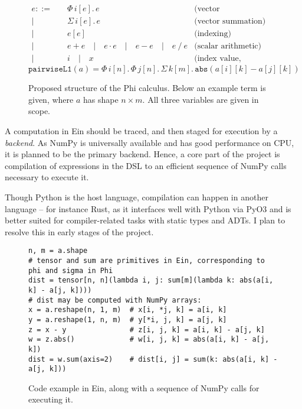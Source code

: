 \begin{figure}[h]
    \centering
    \begin{align*}
        e ::=& \quad \Phi\, i[e].\, e & \text{(vector comprehension)} \\
        |& \quad \Sigma\, i[e].\, e  & \text{(vector summation)} \\
        |& \quad e[e]  & \text{(indexing)} \\
        |& \quad e + e \quad | \quad e \cdot e \quad | \quad e - e \quad | \quad e \mathop{/} e   & \text{(scalar arithmetic)} \\
        |& \quad i \quad | \quad x &\text{(index value, variable)}
    \end{align*} 
    $$ \texttt{pairwiseL1}(a) = \Phi \,i[n].\, \Phi \,j[n].\, \Sigma\, k[m].\,
    \texttt{abs}\left( a[i][k] - a[j][k] \right) $$
    \caption{Proposed structure of the Phi calculus. Below an example term is given, where $a$ has shape $n \times m$. All three variables are given in scope.}
    \label{fig:phi-calculus}
\end{figure}
A computation in Ein should be traced, and then staged for execution by a \textit{backend}. As NumPy is universally available and has good performance on CPU, it is planned to be the primary backend. Hence, a core part of the project is compilation of expressions in the DSL to an efficient sequence of NumPy calls necessary to execute it.

Though Python is the host language, compilation can happen in another language -- for instance Rust, as it interfaces well with Python via PyO3 \cite{PyO3_Project_and_Contributors_PyO3} and is better suited for compiler-related tasks with static types and ADTs. I plan to resolve this in early stages of the project.

\begin{figure}[h]
    \centering
    \begin{verbatim}
n, m = a.shape
# tensor and sum are primitives in Ein, corresponding to phi and sigma in Phi
dist = tensor[n, n](lambda i, j: sum[m](lambda k: abs(a[i, k] - a[j, k])))
# dist may be computed with NumPy arrays:
x = a.reshape(n, 1, m)  # x[i, *j, k] = a[i, k]
y = a.reshape(1, n, m)  # y[*i, j, k] = a[j, k]
z = x - y               # z[i, j, k] = a[i, k] - a[j, k]
w = z.abs()             # w[i, j, k] = abs(a[i, k] - a[j, k])
dist = w.sum(axis=2)    # dist[i, j] = sum(k: abs(a[i, k] - a[j, k]))
\end{verbatim}
    \caption{Code example in Ein, along with a sequence of NumPy calls for executing it.}
    \label{fig:pairwise-l1-ein}
\end{figure}

